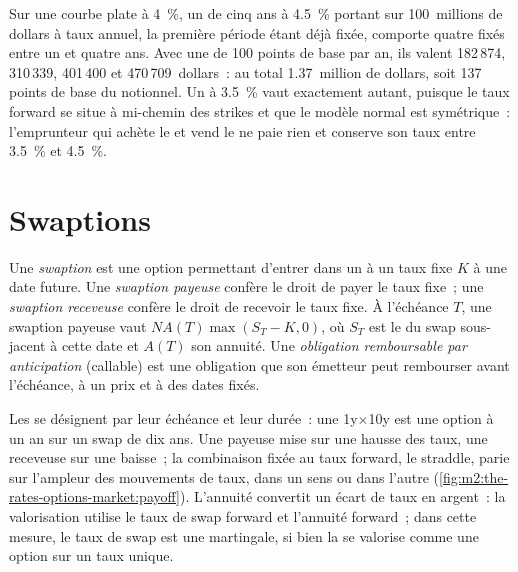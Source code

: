\begin{example}\label{ex:m2:the-rates-options-market:cap}
Sur une courbe plate à 4~\%, un  de cinq ans à 4.5~\% portant sur 100~millions de dollars
à taux annuel, la première période étant déjà fixée, comporte quatre  fixés entre un et
quatre ans. Avec une  de 100 points de base par an, ils valent
182\,874, 310\,339, 401\,400 et 470\,709~dollars~: au total 1.37~million de dollars, soit 137
points de base du notionnel. Un  à 3.5~\% vaut exactement autant, puisque le
taux forward se situe à mi-chemin des strikes et que le modèle normal est symétrique~:
l'emprunteur qui achète le  et vend le  ne paie rien et conserve son taux
entre 3.5~\% et 4.5~\%.
\end{example}

\section{Swaptions}

\begin{definition}\label{def:m2:the-rates-options-market:swaption}
Une \emph{swaption} est une option permettant d'entrer dans un 
à un taux fixe $K$ à une date future. Une \emph{swaption
payeuse} confère le droit de payer le taux fixe~; une
\emph{swaption receveuse} confère le droit de recevoir le taux fixe.
À l'échéance $T$, une swaption payeuse vaut $N A(T)\max(S_T - K, 0)$, où $S_T$ est le
 du swap sous-jacent à cette date et $A(T)$ son annuité. Une \emph{obligation
remboursable par anticipation} (callable) est une obligation que son émetteur peut
rembourser avant l'échéance, à un prix et à des dates fixés.
\end{definition}

Les  se désignent par leur échéance et leur durée~: une 1y$\times$10y est une option à un an sur
un swap de dix ans. Une payeuse mise sur une hausse des taux, une receveuse sur une baisse~;
la combinaison fixée au taux forward, le straddle, parie sur l'ampleur des mouvements de taux,
dans un sens ou dans l'autre (\cref{fig:m2:the-rates-options-market:payoff}).
L'annuité convertit un écart de taux en argent~: la valorisation utilise le taux de swap forward
et l'annuité forward~; dans cette mesure, le taux de swap est une martingale, si bien
la  se valorise comme une option sur un taux unique.


